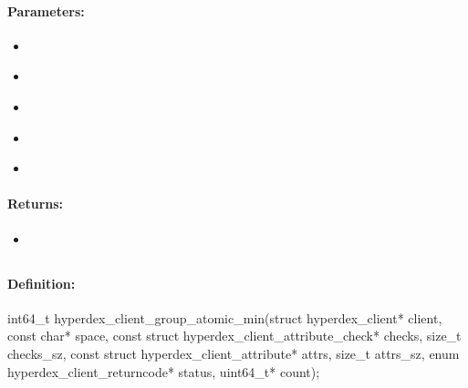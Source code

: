 \paragraph{Parameters:}
\begin{itemize}[noitemsep]
\item {}\\

\item {}\\

\item {}\\

\item {}\\

\item {}\\

\end{itemize}

\paragraph{Returns:}
\begin{itemize}[noitemsep]
\item {}\\

\end{itemize}

\pagebreak
\subsection{}
\label{api:c:group_atomic_min}


\paragraph{Definition:}
\begin{ccode}
int64_t hyperdex_client_group_atomic_min(struct hyperdex_client* client,
        const char* space,
        const struct hyperdex_client_attribute_check* checks, size_t checks_sz,
        const struct hyperdex_client_attribute* attrs, size_t attrs_sz,
        enum hyperdex_client_returncode* status,
        uint64_t* count);
\end{ccode}

